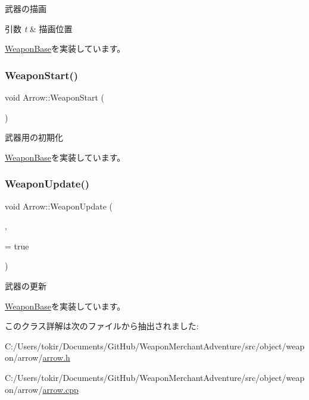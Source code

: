 武器の描画 


\begin{DoxyParams}{引数}
{\em t} & 描画位置 \\
\hline
\end{DoxyParams}


\mbox{\hyperlink{class_weapon_base_a619809ea6c169446d9524f8089057436}{Weapon\+Base}}を実装しています。

\mbox{\label{class_arrow_a0bdc2c0f450a1c6f4d38e49fdfd60a88}} 
\subsubsection{\texorpdfstring{Weapon\+Start()}{WeaponStart()}}
{\footnotesize\ttfamily void Arrow\+::\+Weapon\+Start (\begin{DoxyParamCaption}{ }\end{DoxyParamCaption})\hspace{0.3cm}{\ttfamily [virtual]}}



武器用の初期化 



\mbox{\hyperlink{class_weapon_base_a25cd4c351638b76377e93341a9545712}{Weapon\+Base}}を実装しています。

\mbox{\label{class_arrow_a00f34c3153e0b2dc50259b8a249ee8ad}} 
\subsubsection{\texorpdfstring{Weapon\+Update()}{WeaponUpdate()}}
{\footnotesize\ttfamily void Arrow\+::\+Weapon\+Update (\begin{DoxyParamCaption}\item[{const \mbox{\hyperlink{common_8h_afb0c5e21d4133ff4f200992c0b534e1b}{V\+E\+C2}} \&}]{,  }\item[{bool}]{ = {\ttfamily true} }\end{DoxyParamCaption})\hspace{0.3cm}{\ttfamily [virtual]}}



武器の更新 



\mbox{\hyperlink{class_weapon_base_a389110ad7653d16eecfd9770a8b6b08e}{Weapon\+Base}}を実装しています。



このクラス詳解は次のファイルから抽出されました\+:\begin{DoxyCompactItemize}
\item 
C\+:/\+Users/tokir/\+Documents/\+Git\+Hub/\+Weapon\+Merchant\+Adventure/src/object/weapon/arrow/\mbox{\hyperlink{arrow_8h}{arrow.\+h}}\item 
C\+:/\+Users/tokir/\+Documents/\+Git\+Hub/\+Weapon\+Merchant\+Adventure/src/object/weapon/arrow/\mbox{\hyperlink{arrow_8cpp}{arrow.\+cpp}}\end{DoxyCompactItemize}
